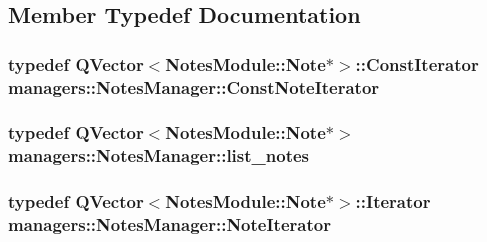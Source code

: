 \subsection{Member Typedef Documentation}
\hypertarget{classmanagers_1_1_notes_manager_ac3a1b286533c5c0b96f0690e5a1ed5f6}{
\subsubsection[{Const\-Note\-Iterator}]{\setlength{\rightskip}{0pt plus 5cm}typedef Q\-Vector$<${\bf Notes\-Module\-::\-Note}$\ast$$>$\-::Const\-Iterator {\bf managers\-::\-Notes\-Manager\-::\-Const\-Note\-Iterator}}}\label{classmanagers_1_1_notes_manager_ac3a1b286533c5c0b96f0690e5a1ed5f6}
\hypertarget{classmanagers_1_1_notes_manager_a8db626da0db796108544d7bba0455d6e}{
\subsubsection[{list\-\_\-notes}]{\setlength{\rightskip}{0pt plus 5cm}typedef Q\-Vector$<${\bf Notes\-Module\-::\-Note}$\ast$$>$ {\bf managers\-::\-Notes\-Manager\-::list\-\_\-notes}}}\label{classmanagers_1_1_notes_manager_a8db626da0db796108544d7bba0455d6e}
\hypertarget{classmanagers_1_1_notes_manager_a5cc8bcf779f41be7de324080a7a4e80d}{
\subsubsection[{Note\-Iterator}]{\setlength{\rightskip}{0pt plus 5cm}typedef Q\-Vector$<${\bf Notes\-Module\-::\-Note}$\ast$$>$\-::Iterator {\bf managers\-::\-Notes\-Manager\-::\-Note\-Iterator}}}\label{classmanagers_1_1_notes_manager_a5cc8bcf779f41be7de324080a7a4e80d}


